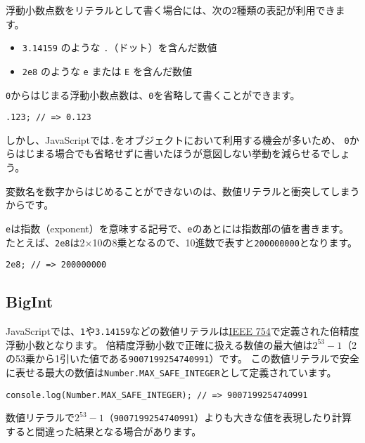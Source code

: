 浮動小数点数をリテラルとして書く場合には、次の2種類の表記が利用できます。

\begin{itemize}
\item
  \texttt{3.14159} のような
  \texttt{.}（ドット）を含んだ数値
\item
  \texttt{2e8} のような \texttt{e}
  または \texttt{E} を含んだ数値
\end{itemize}

\texttt{0}からはじまる浮動小数点数は、\texttt{0}を省略して書くことができます。

\begin{lstlisting}
.123; // => 0.123
\end{lstlisting}

しかし、JavaScriptでは\texttt{.}をオブジェクトにおいて利用する機会が多いため、
\texttt{0}からはじまる場合でも省略せずに書いたほうが意図しない挙動を減らせるでしょう。

\begin{note}{}
変数名を数字からはじめることができないのは、数値リテラルと衝突してしまうからです。
\end{note}

\texttt{e}は指数（exponent）を意味する記号で、\texttt{e}のあとには指数部の値を書きます。
たとえば、\texttt{2e8}は2×10の8乗となるので、10進数で表すと\texttt{200000000}となります。

\begin{lstlisting}
2e8; // => 200000000
\end{lstlisting}
\vspace{-2mm}
\hypertarget{bigint-literal}{%
\subsection[BigInt]{BigInt\,\protect{}}\label{bigint-literal}}

JavaScriptでは、\texttt{1}や\texttt{3.14159}などの数値リテラルは\href{https://ja.wikipedia.org/wiki/IEEE_754}{IEEE 754}で定義された倍精度浮動小数となります。
倍精度浮動小数で正確に扱える数値の最大値は$2^{53}-1$（2の53乗から1引いた値である\texttt{9007199254740991}）です。
この数値リテラルで安全に表せる最大の数値は\texttt{Number.MAX\_SAFE\_INTEGER}として定義されています。

\begin{lstlisting}
console.log(Number.MAX_SAFE_INTEGER); // => 9007199254740991
\end{lstlisting}

数値リテラルで$2^{53}-1$（\texttt{9007199254740991}）よりも大きな値を表現したり計算すると間違った結果となる場合があります。


